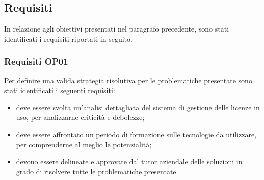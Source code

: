 \subsection{Requisiti}

In relazione agli obiettivi presentati nel paragrafo precedente, sono stati identificati i requisiti riportati in seguito.

\subsubsection{Requisiti OP01}
Per definire una valida strategia risolutiva per le problematiche presentate sono stati identificati i seguenti requisiti:

\begin{itemize}
\item deve essere svolta un'analisi dettagliata del sistema di gestione delle licenze in uso, per analizzarne criticità e debolezze;
\item deve essere affrontato un periodo di formazione sulle tecnologie da utilizzare, per comprenderne al meglio le potenzialità;
\item devono essere delineate e approvate dal tutor aziendale delle soluzioni in grado di risolvere tutte le problematiche presentate.

\end{itemize}


